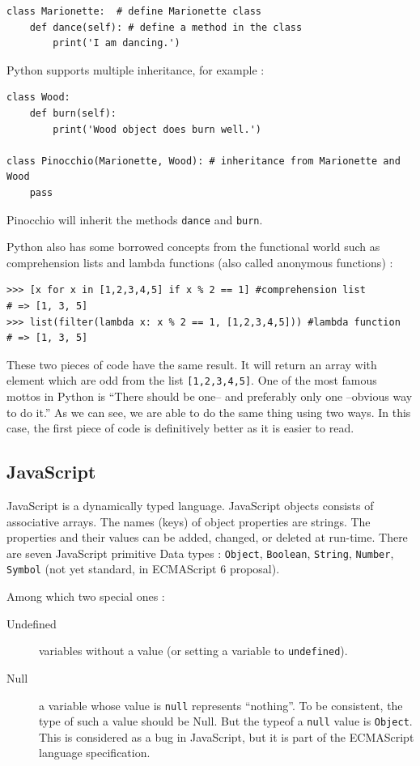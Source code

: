\documentclass[a4paper,10pt]{article}
\begin{document}
\begin{lstlisting}
class Marionette:  # define Marionette class
    def dance(self): # define a method in the class
        print('I am dancing.')
\end{lstlisting}


Python supports multiple inheritance, for example :


\begin{lstlisting}
class Wood:
    def burn(self):
        print('Wood object does burn well.')

class Pinocchio(Marionette, Wood): # inheritance from Marionette and Wood
    pass
\end{lstlisting}

Pinocchio will inherit the methods \lstinline|dance| and \lstinline|burn|. 

Python also has some borrowed concepts from the functional world such as comprehension lists and lambda functions (also called anonymous functions) :

\begin{lstlisting}
>>> [x for x in [1,2,3,4,5] if x % 2 == 1] #comprehension list
# => [1, 3, 5]
>>> list(filter(lambda x: x % 2 == 1, [1,2,3,4,5])) #lambda function
# => [1, 3, 5]
\end{lstlisting}

These two pieces of code have the same result. It will return an array with element which are odd from the list \lstinline|[1,2,3,4,5]|. One of the most famous mottos in Python is “There should be one-- and preferably only one --obvious way to do it.” As we can see, we are able to do the same thing using two ways. In this case, the first piece of code is definitively better as it is easier to read.

\subsection{JavaScript}
\setjs

JavaScript is a dynamically typed language.
JavaScript objects consists of associative arrays.
The names (keys) of object properties are strings.
The properties and their values can be added, changed, or deleted at run-time.
There are seven JavaScript primitive Data types : \lstinline|Object|, \lstinline|Boolean|, \lstinline|String|, \lstinline|Number|, \lstinline|Symbol| (not yet standard, in ECMAScript 6 proposal). 

Among which two special ones : 
\begin{description}
\item[Undefined] variables without a value (or setting a variable to \lstinline|undefined|).
\item[Null] a variable whose value is \lstinline|null| represents ``nothing''. To be consistent, the type of such a value should be Null. But the typeof a \lstinline|null| value is \lstinline|Object|. This is considered as a bug in JavaScript, but it is part of the ECMAScript language specification.
\end{description}
\end{document}
